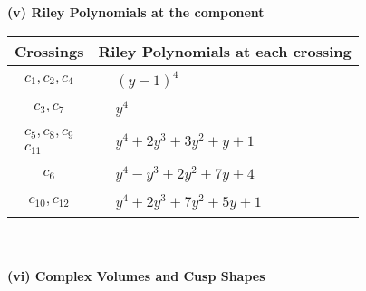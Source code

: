 \documentclass[1p]{elsarticle_modified}
\theoremstyle{definition}
\begin{document}
\newpage\renewcommand{\arraystretch}{1}
\flushleft \textbf{(v) Riley Polynomials at the component}\newline \\
\begin{tabular}{m{50pt}|m{274pt}}
Crossings & \hspace{64pt}Riley Polynomials at each crossing \\
\hline $$\begin{aligned}c_{1},c_{2},c_{4}\end{aligned}$$&$\begin{aligned}
&(y-1)^4
\end{aligned}$\\
\hline $$\begin{aligned}c_{3},c_{7}\end{aligned}$$&$\begin{aligned}
&y^4
\end{aligned}$\\
\hline $$\begin{aligned}c_{5},c_{8},c_{9}\\c_{11}\end{aligned}$$&$\begin{aligned}
&y^4+2 y^3+3 y^2+y+1
\end{aligned}$\\
\hline $$\begin{aligned}c_{6}\end{aligned}$$&$\begin{aligned}
&y^4- y^3+2 y^2+7 y+4
\end{aligned}$\\
\hline $$\begin{aligned}c_{10},c_{12}\end{aligned}$$&$\begin{aligned}
&y^4+2 y^3+7 y^2+5 y+1
\end{aligned}$\\
\hline
\end{tabular}\\~\\
\newpage\flushleft \textbf{(vi) Complex Volumes and Cusp Shapes}
\end{document}
